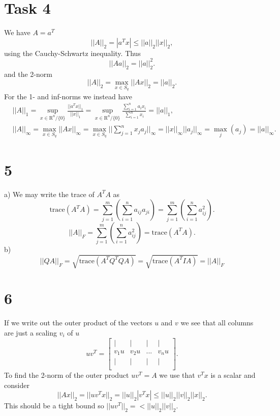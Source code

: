 \documentclass{article}
\begin{document}
\section*{Task 4}
We have $A = a^T$ 
\begin{equation}
    ||A||_2 = | a^T x| \leq ||a||_2 ||x||_2,
\end{equation}
using the Cauchy-Schwartz inequality. Thus
\begin{equation}
    ||Aa||_2 = ||a||_2^2.
\end{equation}
and the 2-norm
\begin{equation}
    ||A||_2 =  \max_{x \in S_q} ||Ax||_2 = ||a||_2.
\end{equation}
For the 1- and inf-norms we instead have
\begin{align}
& ||A||_1 = 
\sup_{x \in \mathrm{R}^n / \{ 0 \} } \frac{||a^T x||_1}{||x||_1} =
\sup_{x \in \mathrm{R}^n / \{ 0 \} } \frac{\sum_{i=1}^n a_i x_i}{\sum_{i=1}^n x_i} = ||a||_1, \\ 
& ||A||_\infty = 
\max_{x \in S_q} ||Ax||_\infty = 
\max_{x \in S_q} || \sum_{j=1}^n x_j a_j ||_\infty = 
||x||_\infty ||a_j||_\infty = \max_j (a_j) = ||a||_\infty.
\end{align}
\section*{5}
a)
We may write the trace of $A^T A$ as
\begin{equation}
    \text{trace}(A^T A) = \sum_{j=1}^m (\sum_{i=1}^n a_{ij} a_{ji}) =  
    \sum_{j=1}^m (\sum_{i=1}^n a_{ij}^2 ).
\end{equation}
%
\begin{equation}
    ||A||_F = \sum_{j=1}^m (\sum_{i=1}^n a_{ij}^2 ) = \text{trace}(A^T A).
\end{equation}
b)
\begin{equation}
    ||QA||_F = \sqrt{\text{trace}(A^TQ^T Q A)} = 
               \sqrt{\text{trace}(A^T I A)}    =
               ||A||_F
\end{equation}
\section*{6}
If we write out the outer product of the vectors $u$ and $v$ we see
that all columns are just a scaling $v_i$ of $u$
\begin{equation}
    u v ^ T =
    \begin{bmatrix}
    \vert & \vert & \vert & \vert \\
    v_1 u & v_2 u & ... & v_n u \\
    \vert & \vert & \vert & \vert \\
    \end{bmatrix}.
\end{equation}
To find the 2-norm of the outer product $u v^T = A$ we use that $v^T x$ is a scalar and consider
\begin{equation}
    ||Ax||_2 = ||uv^T x||_2 = 
    ||u||_2 |v^T x| \leq ||u||_2 ||v||_2 ||x||_2.
\end{equation}
This should be a tight bound so $||uv^T||_2 = < ||u||_2 ||v||_2$. 
\end{document}
